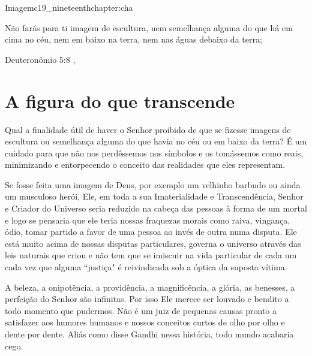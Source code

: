 \begin{chapterpage}{Imagem}{c19_nineteenthchapter:cha}

\begin{myquotation}Não farás para ti imagem de escultura, nem semelhança alguma do que há em cima no céu, nem em baixo na terra, nem nas águas debaixo da terra;


 
\par\vspace*{15mm}
\mbox{}\hfill \emdash{}Deuteronômio 5:8 
, %
\par\end{myquotation}

\end{chapterpage}



\section{A figura do que transcende}\label{c1_basicformatting:sec}

\emdash{}Qual a finalidade útil de haver o Senhor proibido de que se fizesse imagens de escultura ou semelhança alguma do que havia no céu ou em baixo da terra? É um cuidado para que não nos perdêssemos nos símbolos e os tomássemos como reais, minimizando e entorpecendo o conceito das realidades que eles representam.

\emdash{}Se fosse feita uma imagem de Deus, por exemplo um velhinho barbudo ou ainda um musculoso herói, Ele, em toda a sua Imaterialidade e Transcendência, Senhor e Criador do Universo seria reduzido na cabeça das pessoas à forma de um mortal e logo se pensaria que ele teria nossas fraquezas morais como raiva, vingança, ódio, tomar partido a favor de uma pessoa ao invés de outra numa disputa. Ele está muito acima de nossas disputas particulares, governa o universo através das leis naturais que criou e não tem que se imiscuir na vida particular de cada um cada vez que alguma ``justiça" é reivindicada sob a óptica da suposta vítima.

\emdash{}A beleza, a onipotência, a providência, a magnificência, a glória, as benesses, a perfeição do Senhor são infinitas. Por isso Ele merece ser louvado e bendito a todo momento que pudermos. Não é um juiz de pequenas causas pronto a satisfazer aos humores humanos e nossos conceitos curtos de olho por olho e dente por dente. Aliás como disse Gandhi nessa história, todo mundo acabaria cego.

